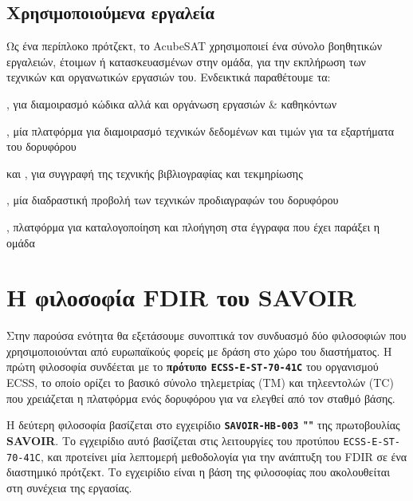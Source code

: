 \documentclass[a4paper,nobib]{tufte-book}
\begin{document}

\section{Χρησιμοποιούμενα εργαλεία}

Ως ένα περίπλοκο πρότζεκτ, το AcubeSAT χρησιμοποιεί ένα σύνολο βοηθητικών εργαλειών, έτοιμων ή κατασκευασμένων στην ομάδα, για την εκπλήρωση των τεχνικών και οργανωτικών εργασιών του. Ενδεικτικά παραθέτουμε τα:
\begin{compactitem}
	\item {}, για διαμοιρασμό κώδικα αλλά και οργάνωση εργασιών \& καθηκόντων
	\item {}, μία πλατφόρμα για διαμοιρασμό τεχνικών δεδομένων και τιμών για τα εξαρτήματα του δορυφόρου
	\item  {} και , για συγγραφή της τεχνικής βιβλιογραφίας και τεκμηρίωσης
	\item {}, μία διαδραστική προβολή των τεχνικών προδιαγραφών του δορυφόρου
	\item {}, πλατφόρμα για καταλογοποίηση και πλοήγηση στα έγγραφα που έχει παράξει η ομάδα
\end{compactitem}

\chapter{Η φιλοσοφία \acs{FDIR} του SAVOIR}
\label{cap:savoir}

Στην παρούσα ενότητα θα εξετάσουμε συνοπτικά τον συνδυασμό δύο φιλοσοφιών που χρησιμοποιούνται από ευρωπαϊκούς φορείς με δράση στο χώρο του διαστήματος. Η πρώτη φιλοσοφία συνδέεται με το \textbf{πρότυπο \texttt{ECSS-E-ST-70-41C}} \autocite{ECSS-E-ST-70-41C} του οργανισμού \acf{ECSS}, το οποίο ορίζει το βασικό σύνολο τηλεμετρίας (\acs{TM}) και τηλεεντολών (\acs{TC}) που χρειάζεται η πλατφόρμα ενός δορυφόρου για να ελεγθεί από τον σταθμό βάσης.

Η δεύτερη φιλοσοφία βασίζεται στο εγχειρίδιο \textbf{\texttt{SAVOIR-HB-003} ""} \autocite{SAVOIR-HB-003} της πρωτοβουλίας \textbf{\acf{SAVOIR}}. Το εγχειρίδιο αυτό βασίζεται στις λειτουργίες του προτύπου \texttt{ECSS-E-ST-70-41C}, και προτείνει μία λεπτομερή μεθοδολογία για την ανάπτυξη του \ac{FDIR} σε ένα διαστημικό πρότζεκτ. Το εγχειρίδιο είναι η βάση της φιλοσοφίας που ακολουθείται στη συνέχεια της εργασίας.
\end{document}
